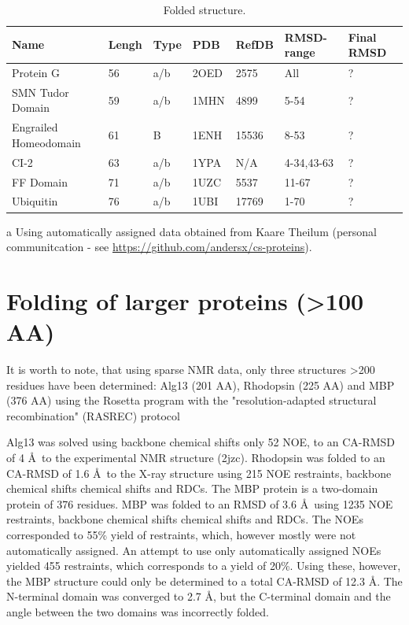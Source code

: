 \begin{table}[h]
    \caption{Folded structure.}
    \begin{center}
    \begin{threeparttable}
    \begin{tabular}{l l l l l  l l}
Name                & Lengh    & Type & PDB     & RefDB     & RMSD-range    & Final RMSD  \\\hline
Protein G           & 56       & a/b & 2OED    & 2575      & All           & ?           \\
SMN Tudor Domain    & 59       & a/b & 1MHN    & 4899      & 5-54          & ?           \\
Engrailed Homeodomain & 61     & B   & 1ENH    & 15536     & 8-53          & ?           \\
CI-2                & 63       & a/b & 1YPA    & N/A\tnote{a}& 4-34,43-63  & ?           \\
FF Domain           & 71       & a/b & 1UZC    & 5537      & 11-67         & ?           \\
Ubiquitin           & 76       & a/b & 1UBI    & 17769     & 1-70          & ?
    \end{tabular}
    \begin{tablenotes}
    \item[a] Using automatically assigned data obtained from Kaare Theilum (personal communitcation - see \url{https://github.com/andersx/cs-proteins}).
    \end{tablenotes}
    \end{threeparttable}
    \end{center}
    \label{tab:folding_small}
\end{table}

\section{Folding of larger proteins (\textgreater 100 AA)}

It is worth to note, that using sparse NMR data, only three structures \textgreater 200 residues have been determined: Alg13 (201 AA), Rhodopsin (225 AA) and MBP (376 AA) using the Rosetta program with the "resolution-adapted structural recombination" (RASREC) protocol

Alg13 was solved using backbone chemical shifts only 52 NOE, to an CA-RMSD of 4 \AA~to the experimental NMR structure (2jzc).
Rhodopsin was folded to an CA-RMSD of 1.6 \AA~to the X-ray structure using 215 NOE restraints, backbone chemical shifts chemical shifts and RDCs.
The MBP protein is a two-domain protein of 376 residues.
MBP was folded to an RMSD of 3.6 \AA~using 1235 NOE restraints, backbone chemical shifts chemical shifts and RDCs.
The NOEs corresponded to 55\% yield of restraints, which, however mostly were not automatically assigned.
An attempt to use only automatically assigned NOEs yielded 455 restraints, which corresponds to a yield of 20\%. Using these, however, the MBP structure could only be determined to a total CA-RMSD of 12.3 \AA.
The N-terminal domain was converged to 2.7 \AA, but the C-terminal domain and the angle between the two domains was incorrectly folded.

